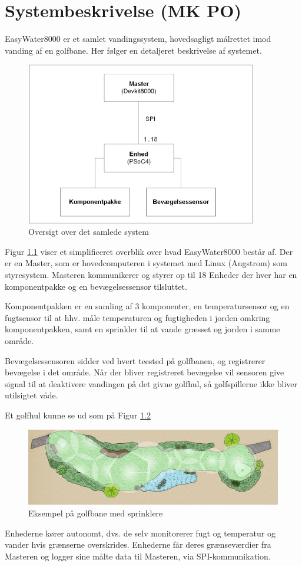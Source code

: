 \chapter{Systembeskrivelse (MK PO)}

EasyWater8000 er et samlet vandingssystem, hovedsagligt målrettet imod vanding af en golfbane. Her følger en detaljeret beskrivelse af systemet.

\begin{figure}[H]
  \centering
    \includegraphics[width=0.9\textwidth]{billeder/systembeskrivelse}
    \caption{Oversigt over det samlede system}
    \label{fig:systembeskrivelse}
\end{figure}

Figur \ref{fig:systembeskrivelse} viser et simplificeret overblik over hvad EasyWater8000 består af. Der er en Master, som er hovedcomputeren i systemet med Linux (Angstrom) som styresystem. Masteren kommunikerer og styrer op til 18 Enheder der hver har en komponentpakke og en bevægelsessensor tilsluttet.

Komponentpakken er en samling af 3 komponenter, en temperatursensor og en fugtsensor til at hhv. måle temperaturen og fugtigheden i jorden omkring komponentpakken, samt en sprinkler til at vande græsset og jorden i samme område.

Bevægelsessensoren sidder ved hvert teested på golfbanen, og registrerer bevægelse i det område. Når der bliver registreret bevægelse vil sensoren give signal til at deaktivere vandingen på det givne golfhul, så golfspillerne ikke bliver utilsigtet våde.

Et golfhul kunne se ud som på Figur \ref{fig:hul_med_sprinkler}

\begin{figure}[H]
  \centering
    \includegraphics[width=\textwidth]{billeder/hul_med_sprinkler}
    \caption{Eksempel på golfbane med sprinklere}
    \label{fig:hul_med_sprinkler}
\end{figure}

Enhederne kører autonomt, dvs. de selv monitorerer fugt og temperatur og vander hvis grænserne overskrides. Enhederne får deres grænseværdier fra Masteren og logger sine målte data til Masteren, via SPI-kommunikation.